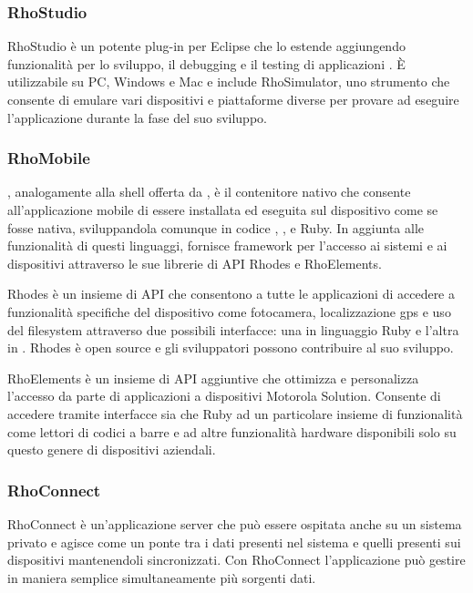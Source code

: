             \subsubsection{RhoStudio}
                RhoStudio è un potente plug-in per Eclipse che lo estende aggiungendo
                funzionalità per lo sviluppo, il debugging e il testing di
                applicazioni \rhom{}. È utilizzabile su PC, Windows e Mac e
                include RhoSimulator, uno strumento che consente di emulare
                vari dispositivi e piattaforme diverse per provare ad eseguire
                l'applicazione durante la fase del suo sviluppo.
            \subsubsection{RhoMobile}
                \rhom{}, analogamente alla shell offerta da \pg{}, è il contenitore
                nativo che consente all'applicazione mobile di essere installata ed
                eseguita sul dispositivo come se fosse nativa, sviluppandola
                comunque in codice \html{}, \css{}, \js{} e Ruby. In aggiunta
                alle funzionalità di questi linguaggi, \rhom{} fornisce
                frame\-work per l'accesso ai sistemi e ai dispositivi attraverso
                le sue librerie di API Rhodes e RhoElements.

                Rhodes è un insieme di API che consentono a tutte le applicazioni
                \rhom{} di accedere a funzionalità specifiche del dispositivo
                come fotocamera, localizzazione gps e uso del filesys\-tem attraverso
                due possibili interfacce: una in linguaggio Ruby e l'altra in
                \js{}. Rhodes è open \mbox{source} e gli sviluppatori possono
                contribuire al suo sviluppo.

                RhoElements è un insieme di API aggiuntive che ottimizza e personalizza
                l'accesso da parte di applicazioni \rhom{} a dispositivi
                Motorola Solution. Consente di accedere tramite interfacce
                sia \js{} che Ruby ad un particolare insieme di funzionalità
                come lettori di codici a barre e ad altre funzionalità
                hardware disponibili solo su questo genere di dispositivi
                aziendali.
            \subsubsection{RhoConnect}
                RhoConnect è un'applicazione server che può essere ospitata anche
                su un sistema privato e agisce come un ponte tra i dati presenti
                nel sistema e quelli presenti sui dispositivi mantenendoli sincronizzati.
                Con RhoConnect l'applicazione può gestire in maniera semplice
                simultaneamente più sorgenti dati.
